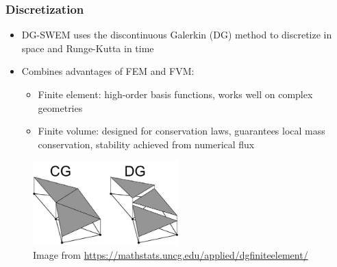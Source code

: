 \documentclass[10pt]{oden_beamer}
\newcommand\Dt[1]{\frac{d #1}{dt}}
\begin{document}
\begin{frame}
  \frametitle{Discretization}
  \begin{itemize}
  \item DG-SWEM uses the discontinuous Galerkin (DG) method to discretize in space and Runge-Kutta in time
  \item Combines advantages of FEM and FVM:
    \begin{itemize}
    \item Finite element: high-order basis functions, works well on complex geometries
    \item Finite volume: designed for conservation laws, guarantees local mass conservation, stability achieved from numerical flux
    \end{itemize}
  \end{itemize}
  \begin{figure}[h]
    \centering
    \includegraphics[width=0.5\textwidth]{cgdg.jpg}
    \caption*{Image from \url{https://mathstats.uncg.edu/applied/dgfiniteelement/}}
  \end{figure}
\end{frame}

\end{document}
